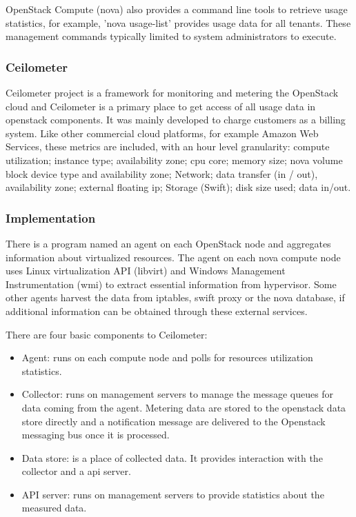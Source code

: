 \documentclass{sig-alternate}
\begin{document}
OpenStack Compute (nova) also provides a command line tools to retrieve usage statistics, for example, 'nova usage-list' provides usage data for all tenants. These management commands typically limited to system administrators to execute.

\subsubsection{Ceilometer}

Ceilometer project is a framework for monitoring and metering the OpenStack cloud and Ceilometer is a primary place to get access of all usage data in openstack components. It was mainly developed to charge customers as a billing system. Like other commercial cloud platforms, for example Amazon Web Services, these metrics are included, with an hour level granularity:
  compute utilization;
   instance type;
   availability zone;
   cpu core;
   memory size;
   nova volume block device type and availability zone;
   Network;
   data transfer (in / out), availability zone;
   external floating ip;
   Storage (Swift);
   disk size used;
   data in/out.

\subsubsection{Implementation}

There is a program named an agent on each OpenStack node and aggregates information about virtualized resources. The agent on each nova compute node uses Linux virtualization API (libvirt) and Windows Management Instrumentation (wmi) to extract essential information from hypervisor. Some other agents harvest the data from iptables, swift proxy or the nova database, if additional information can be obtained through these external services.

There are four basic components to Ceilometer:

\begin{itemize}
  \item Agent: runs on each compute node and polls for resources utilization statistics.
  \item Collector: runs on management servers to manage the message queues for data coming from the agent. Metering data are stored to the openstack data store directly and a notification message are delivered to the Openstack messaging bus once it is processed.
  \item Data store: is a place of collected data. It provides interaction with the collector and a api server.
  \item API server: runs on management servers to provide statistics about the measured data.
\end{itemize}
\end{document}
